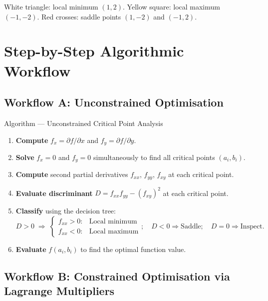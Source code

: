 \documentclass[12pt,a4paper]{article}
\begin{document}
\noindent White triangle: local minimum $(1,2)$. Yellow square: local maximum $(-1,-2)$. Red crosses: saddle points $(1,-2)$ and $(-1,2)$.

\section{Step-by-Step Algorithmic Workflow}

\subsection*{Workflow A: Unconstrained Optimisation}

\begin{infobox}{Algorithm --- Unconstrained Critical Point Analysis}
\begin{enumerate}
  \item \textbf{Compute} $f_x = \partial f/\partial x$ and $f_y = \partial f/\partial y$.
  \item \textbf{Solve} $f_x = 0$ and $f_y = 0$ simultaneously to find all critical points $(a_i, b_i)$.
  \item \textbf{Compute} second partial derivatives $f_{xx}$, $f_{yy}$, $f_{xy}$ at each critical point.
  \item \textbf{Evaluate discriminant} $D = f_{xx}f_{yy} - (f_{xy})^{2}$ at each critical point.
  \item \textbf{Classify} using the decision tree:
  \[
    D > 0 \;\Rightarrow\; \begin{cases} f_{xx} > 0: & \text{Local minimum} \\ f_{xx} < 0: & \text{Local maximum} \end{cases}; \quad D < 0 \Rightarrow \text{Saddle}; \quad D = 0 \Rightarrow \text{Inspect}.
  \]
  \item \textbf{Evaluate} $f(a_i, b_i)$ to find the optimal function value.
\end{enumerate}
\end{infobox}

\subsection*{Workflow B: Constrained Optimisation via Lagrange Multipliers}
\end{document}
